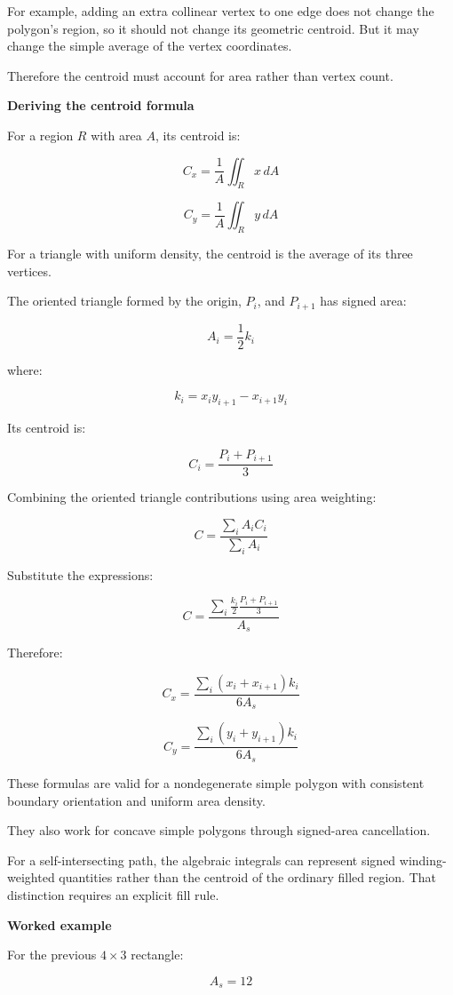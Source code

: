 For example, adding an extra collinear vertex to one edge does not change the polygon's region, so it should not change its geometric centroid. But it may change the simple average of the vertex coordinates.

Therefore the centroid must account for area rather than vertex count.

\textbf{Deriving the centroid formula}

For a region \(R\) with area \(A\), its centroid is:

\[
C_x=\frac1A\iint_R x\,dA
\]

\[
C_y=\frac1A\iint_R y\,dA
\]

For a triangle with uniform density, the centroid is the average of its three vertices.

The oriented triangle formed by the origin, \(P_i\), and \(P_{i+1}\) has signed area:

\[
A_i=\frac12k_i
\]

where:

\[
k_i=x_iy_{i+1}-x_{i+1}y_i
\]

Its centroid is:

\[
C_i=\frac{P_i+P_{i+1}}3
\]

Combining the oriented triangle contributions using area weighting:

\[
C=\frac{\sum_i A_iC_i}{\sum_i A_i}
\]

Substitute the expressions:

\[
C= \frac{ \sum_i \frac{k_i}{2}\frac{P_i+P_{i+1}}3 }{ A_s }
\]

Therefore:

\[
\boxed{ C_x= \frac{ \sum_i(x_i+x_{i+1})k_i }{ 6A_s } }
\]

\[
\boxed{ C_y= \frac{ \sum_i(y_i+y_{i+1})k_i }{ 6A_s } }
\]

These formulas are valid for a nondegenerate simple polygon with consistent boundary orientation and uniform area density.

They also work for concave simple polygons through signed-area cancellation.

For a self-intersecting path, the algebraic integrals can represent signed winding-weighted quantities rather than the centroid of the ordinary filled region. That distinction requires an explicit fill rule.

\textbf{Worked example}

For the previous \(4\times3\) rectangle:

\[
A_s=12
\]

